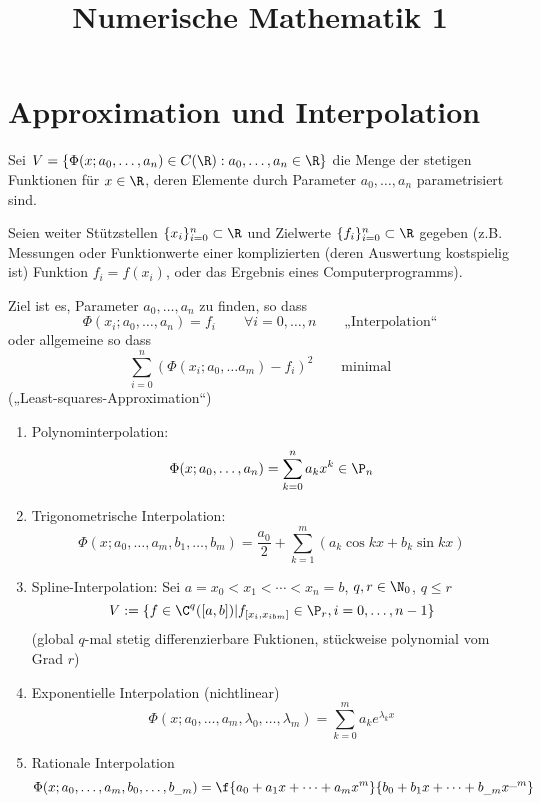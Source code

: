 \documentclass[11pt]{scrartcl}
\title{Numerische Mathematik 1}
\begin{document}
\maketitle

\tableofcontents
\newpage

\section{Approximation und Interpolation}

Sei $V= \{\Phi(x;a_0,\dotsc, a_n) \in C(\R) : a_0,\dotsc,a_n\in \R\}$ die Menge der stetigen Funktionen für $x\in \R$, deren Elemente durch Parameter $a_0,\dotsc,a_n$ parametrisiert sind.

Seien weiter Stützstellen $\{x_i\}_{i=0}^n\subset \R$ und Zielwerte $\{f_i\}_{i=0}^n \subset \R$ gegeben (z.B. Messungen oder Funktionwerte einer komplizierten (deren Auswertung kostspielig ist) Funktion $f_i=f(x_i)$, oder das Ergebnis eines Computerprogramms).

Ziel ist es, Parameter $a_0,\dotsc, a_n$ zu finden, so dass
\[
	\Phi(x_i;a_0,\dotsc, a_n) = f_i \qquad \forall i= 0,\dotsc,n \qquad \text{„Interpolation“}
\]
oder allgemeine so dass
\[
	\sum_{i=0}^n(\Phi(x_i; a_0,\dotsc a_m) -f_i)^2 \qquad \text{minimal}
\]
(„Least-squares-Approximation“)

\begin{ex*}
	\begin{enumerate}
		\item 
			Polynominterpolation:
			\[
				\Phi(x; a_0,\dotsc, a_n) = \sum_{k=0}^na_kx^k \in \P_n
			\]
		\item
			Trigonometrische Interpolation:
			\[
				\Phi ( x;a_0,\dots,a_m,b_1,\dots, b_m ) = \frac{a_{0}}{2} + \sum_{k=1}^m ( a_k \cos kx + b_k \sin kx )
			\]
		\item
			Spline-Interpolation:
			Sei $a=x_0\lt x_1 \lt \dotsb \lt x_n = b$, $q,r\in \N_0$, $q\le r$
			\[
			V := \{f\in \C^q([a,b]) | f_{[x_i,x_{ibm}]}\in \P_r, i=0,\dotsc,n-1\}
			\]
			(global $q$-mal stetig differenzierbare Fuktionen, stückweise polynomial vom Grad $r$)
		\item
			Exponentielle Interpolation (nichtlinear)
			\[
			\Phi(x;a_0,\dotsc, a_m,\lambda_0,\dotsc, \lambda_m) = \sum_{k=0}^m a_ke^{\lambda_k x}
			\]
		\item
			Rationale Interpolation
			\[
				\Phi(x; a_0,\dotsc, a_m, b_0,\dotsc, b_{\_m}) = \f {a_0 + a_1x + \dotsb + a_m x^m}{b_0 + b_1x + \dotsb + b_{\_m}x^{\_m}}
			\]
	\end{enumerate}
\end{ex*}
\end{document}
